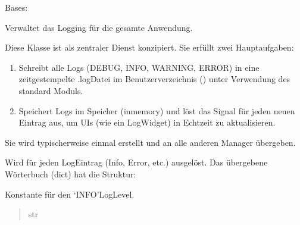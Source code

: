 \documentclass[letterpaper,10pt,english]{sphinxmanual}
\begin{document}
\begin{fulllineitems}
\label{\detokenize{modulab/log_manager:modules.log.LogManager.LogManager}}
\pysigstartsignatures
\pysigline
{}
\pysigstopsignatures
\sphinxAtStartPar
Bases: 

\sphinxAtStartPar
Verwaltet das Logging für die gesamte Anwendung.

\sphinxAtStartPar
Diese Klasse ist als zentraler Dienst konzipiert. Sie erfüllt zwei
Hauptaufgaben:
\begin{enumerate}
%
\item {} 
\sphinxAtStartPar
{} Schreibt alle Logs (DEBUG, INFO, WARNING, ERROR)
in eine zeitgestempelte .log\sphinxhyphen{}Datei im Benutzerverzeichnis
() unter Verwendung des standard \sphinxhyphen{}Moduls.

\item {} 
\sphinxAtStartPar
{} Speichert Logs im Speicher (in\sphinxhyphen{}memory) und
löst das \sphinxhyphen{}Signal für jeden neuen Eintrag aus,
um UIs (wie ein Log\sphinxhyphen{}Widget) in Echtzeit zu aktualisieren.

\end{enumerate}

\sphinxAtStartPar
Sie wird typischerweise einmal erstellt und an alle anderen Manager
übergeben.
\begin{description}
\begin{description}
\sphinxAtStartPar
Wird für jeden Log\sphinxhyphen{}Eintrag (Info, Error, etc.) ausgelöst.
Das übergebene Wörterbuch (dict) hat die Struktur:

\end{description}

\end{description}

\begin{fulllineitems}
\label{\detokenize{modulab/log_manager:modules.log.LogManager.LogManager.INFO}}
\pysigstartsignatures
\pysigline
{}
\pysigstopsignatures
\sphinxAtStartPar
Konstante für den ‘INFO’\sphinxhyphen{}Log\sphinxhyphen{}Level.
\begin{quote}\begin{description}
\sphinxAtStartPar
str


\end{description}
\end{quote}
\end{fulllineitems}
\end{fulllineitems}
\end{document}
